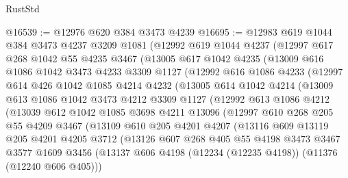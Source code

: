 \begin{lexlean}{RustStd}
\begin{coremodule}
{\begin{coremodule}
{{{{{{{{{{{{{{{{{{{{{{{{{{{{{{{{{{{{{{{{{{{{{{{{{{{{{{{{{{{{{{{{{{{{{{{{{{{{{{{{{{{{{@16539 := @12976 @620 @384 @3473 @4239
@16695 := @12983
    @619
    @1044
    @384
    @3473
    @4237
    @3209
    @1081
    (@12992
      @619
      @1044
      @4237
      (@12997
        @617
        @268
        @1042
        @55
        @4235
        @3467
        (@13005
          @617
          @1042
          @4235
          (@13009
            @616
            @1086
            @1042
            @3473
            @4233
            @3309
            @1127
            (@12992
              @616
              @1086
              @4233
              (@12997
                @614
                @426
                @1042
                @1085
                @4214
                @4232
                (@13005
                  @614
                  @1042
                  @4214
                  (@13009
                    @613
                    @1086
                    @1042
                    @3473
                    @4212
                    @3309
                    @1127
                    (@12992
                      @613
                      @1086
                      @4212
                      (@13039
                        @612
                        @1042
                        @1085
                        @3698
                        @4211
                        @13096
                        (@12997
                          @610
                          @268
                          @205
                          @55
                          @4209
                          @3467
                          (@13109
                            @610
                            @205
                            @4201
                            @4207
                            (@13116
                              @609
                              @13119
                              @205
                              @4201
                              @4205
                              @3712
                              (@13126
                                @607
                                @268
                                @405
                                @55
                                @4198
                                @3473
                                @3467
                                @3577
                                @1609
                                @3456
                                (@13137
                                  @606
                                  @4198
                                  (@12234 (@12235 @4198))
                                  (@11376 (@12240 @606 @405)))
}}}}}}}}}}}}}}}}}}}}}}}}}}}}}}}}}}}}}}}}}}}}}}}}}}}}}}}}}}}}}}}}}}}}}}}}}}}}}}}}}}}}}
\end{coremodule}}
\end{coremodule}
\end{lexlean}
